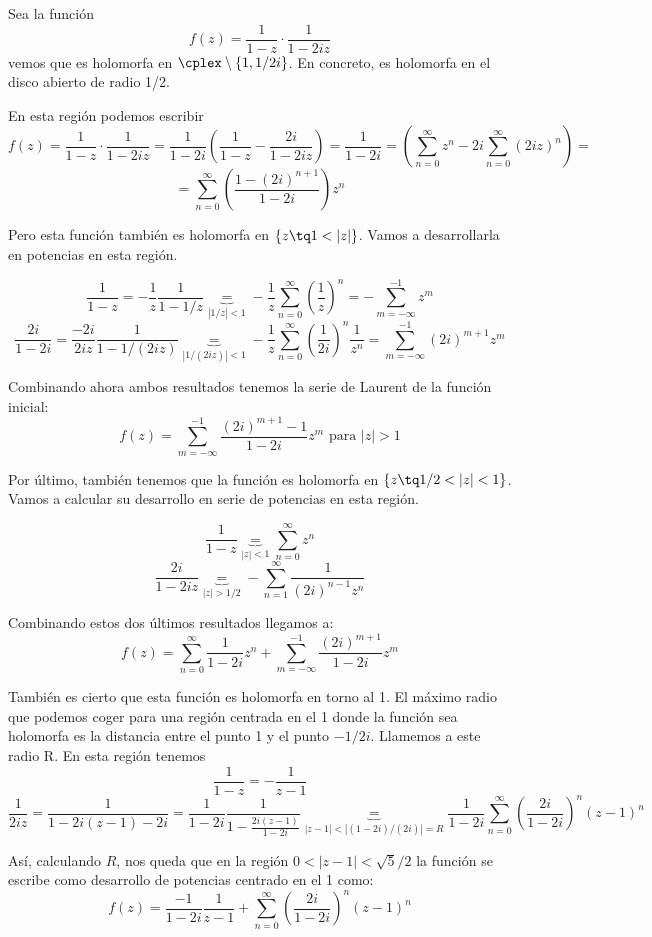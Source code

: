 \documentclass{apuntes}
\begin{document}
\begin{example}
Sea la función
\[f(z)=\frac{1}{1-z}\cdot \frac{1}{1-2iz}\]
vemos que es holomorfa en $\cplex\setminus\{1,1/2i\}$. En concreto, es holomorfa en el disco abierto de radio 1/2.

En esta región podemos escribir
\[f(z)=\frac{1}{1-z}\cdot \frac{1}{1-2iz} = \frac{1}{1-2i}\left(\frac{1}{1-z}-\frac{2i}{1-2iz} \right)=\frac{1}{1-2i}=\left(\sum_{n=0}^{\infty} z^n - 2i\sum_{n=0}^{\infty}(2iz)^n \right)=\]
\[=\sum_{n=0}^{\infty}\left(\frac{1-(2i)^{n+1}}{1-2i}\right)z^n\]

Pero esta función también es holomorfa en $\{z \tq 1<|z|\}$. Vamos a desarrollarla en potencias en esta región.

\[\frac{1}{1-z} = -\frac{1}{z}\frac{1}{1-1/z}\underbrace{=}_{|1/z|<1} -\frac{1}{z}\sum_{n=0}^{\infty}\left(\frac{1}{z}\right)^n = -\sum_{m=-\infty}^{-1}z^m\]
\[\frac{2i}{1-2i}= \frac{-2i}{2iz}\frac{1}{1-1/(2iz)} \underbrace{=}_{|1/(2iz)|<1} -\frac{1}{z}\sum_{n=0}^{\infty}\left(\frac{1}{2i}\right)^n\frac{1}{z^n}=\sum_{m=-\infty}^{-1}(2i)^{m+1}z^m\]

Combinando ahora ambos resultados tenemos la serie de Laurent de la función inicial:
\[f(z)=\sum_{m=-\infty}^{-1}\frac{(2i)^{m+1}-1}{1-2i}z^m \text{ para } |z| >1\]

Por último, también tenemos que la función es holomorfa en $\{z \tq 1/2<|z|<1\}$. Vamos a calcular su desarrollo en serie de potencias en esta región.

\[\frac{1}{1-z} \underbrace{=}_{|z|<1} \sum_{n=0}^{\infty} z^n\]
\[\frac{2i}{1-2iz} \underbrace{=}_{|z|>1/2} - \sum_{n=1}^{\infty}\frac{1}{(2i)^{n-1}z^n}\]

Combinando estos dos últimos resultados llegamos a:
\[f(z)=\sum_{n=0}^{\infty}\frac{1}{1-2i}z^n+\sum_{m=-\infty}^{-1}\frac{(2i)^{m+1}}{1-2i}z^m\]

También es cierto que esta función es holomorfa en torno al 1. El máximo radio que podemos coger para una región centrada en el 1 donde la función sea holomorfa es la distancia entre el punto 1 y el punto $-1/2i$. Llamemos a este radio R. En esta región tenemos
\[\frac{1}{1-z} = -\frac{1}{z-1}\]
\[\frac{1}{2iz} = \frac{1}{1-2i(z-1)-2i} = \frac{1}{1-2i}\frac{1}{1-\frac{2i(z-1)}{1-2i}} \underbrace{=}_{|z-1|<|(1-2i)/(2i)|=R} \frac{1}{1-2i}\sum_{n=0}^{\infty} \left( \frac{2i}{1-2i}\right)^n (z-1)^n\]

Así, calculando $R$, nos queda que en la región $0<|z-1|<\sqrt{5}/2$ la función se escribe como desarrollo de potencias centrado en el 1 como:
\[f(z)=\frac{-1}{1-2i}\frac{1}{z-1}+\sum_{n=0}^{\infty}\left(\frac{2i}{1-2i} \right)^n(z-1)^n\]
\end{example}
\end{document}
